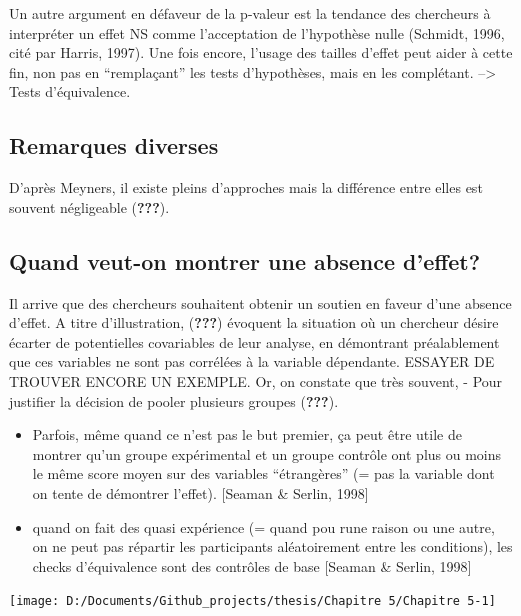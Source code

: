 \documentclass[
  english,
  man]{apa6}
\begin{document}
Un autre argument en défaveur de la p-valeur est la tendance des chercheurs à interpréter un effet NS comme l'acceptation de l'hypothèse nulle (Schmidt, 1996, cité par Harris, 1997). Une fois encore, l'usage des tailles d'effet peut aider à cette fin, non pas en \enquote{remplaçant} les tests d'hypothèses, mais en les complétant. --\textgreater{} Tests d'équivalence.

\hypertarget{remarques-diverses}{%
\subsection{Remarques diverses}\label{remarques-diverses}}

D'après Meyners, il existe pleins d'approches mais la différence entre elles est souvent négligeable ({\textbf{???}}).

\hypertarget{quand-veut-on-montrer-une-absence-deffet}{%
\subsection{Quand veut-on montrer une absence d'effet?}\label{quand-veut-on-montrer-une-absence-deffet}}

Il arrive que des chercheurs souhaitent obtenir un soutien en faveur d'une absence d'effet. A titre d'illustration, ({\textbf{???}}) évoquent la situation où un chercheur désire écarter de potentielles covariables de leur analyse, en démontrant préalablement que ces variables ne sont pas corrélées à la variable dépendante. ESSAYER DE TROUVER ENCORE UN EXEMPLE. Or, on constate que très souvent,
- Pour justifier la décision de pooler plusieurs groupes ({\textbf{???}}).

\begin{itemize}
\item
  Parfois, même quand ce n'est pas le but premier, ça peut être utile de montrer qu'un groupe expérimental et un groupe contrôle ont plus ou moins le même score moyen sur des variables \enquote{étrangères} (= pas la variable dont on tente de démontrer l'effet). {[}Seaman \& Serlin, 1998{]}
\item
  quand on fait des quasi expérience (= quand pou rune raison ou une autre, on ne peut pas répartir les participants aléatoirement entre les conditions), les checks d'équivalence sont des contrôles de base {[}Seaman \& Serlin, 1998{]}
\end{itemize}

\begin{center}\texttt{[image: D:/Documents/Github\_projects/thesis/Chapitre 5/Chapitre 5-1]} \end{center}
\end{document}
